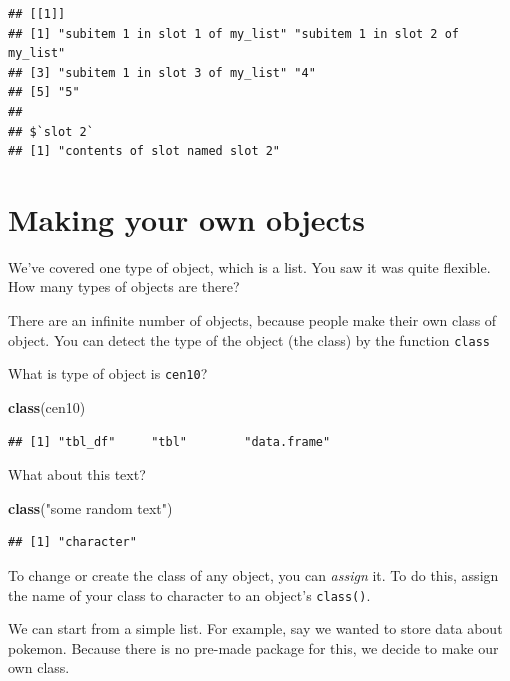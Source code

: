 \documentclass[]{book}
\newenvironment{Shaded}{\begin{snugshade}}{\end{snugshade}}
\newcommand{\KeywordTok}[1]{\textcolor[rgb]{0.13,0.29,0.53}{\textbf{#1}}}
\newcommand{\StringTok}[1]{\textcolor[rgb]{0.31,0.60,0.02}{#1}}
\newcommand{\NormalTok}[1]{#1}
\theoremstyle{definition}
\theoremstyle{definition}
\theoremstyle{definition}
\theoremstyle{remark}
\begin{document}
\begin{verbatim}
## [[1]]
## [1] "subitem 1 in slot 1 of my_list" "subitem 1 in slot 2 of my_list"
## [3] "subitem 1 in slot 3 of my_list" "4"                             
## [5] "5"                             
## 
## $`slot 2`
## [1] "contents of slot named slot 2"
\end{verbatim}

\section{Making your own objects}\label{making-your-own-objects}

We've covered one type of object, which is a list. You saw it was quite
flexible. How many types of objects are there?

There are an infinite number of objects, because people make their own
class of object. You can detect the type of the object (the class) by
the function \texttt{class}

What is type of object is \texttt{cen10}?

\begin{Shaded}
\begin{Highlighting}[]
\KeywordTok{class}\NormalTok{(cen10)}
\end{Highlighting}
\end{Shaded}

\begin{verbatim}
## [1] "tbl_df"     "tbl"        "data.frame"
\end{verbatim}

What about this text?

\begin{Shaded}
\begin{Highlighting}[]
\KeywordTok{class}\NormalTok{(}\StringTok{"some random text"}\NormalTok{)}
\end{Highlighting}
\end{Shaded}

\begin{verbatim}
## [1] "character"
\end{verbatim}

To change or create the class of any object, you can \emph{assign} it.
To do this, assign the name of your class to character to an object's
\texttt{class()}.

We can start from a simple list. For example, say we wanted to store
data about pokemon. Because there is no pre-made package for this, we
decide to make our own class.
\end{document}
